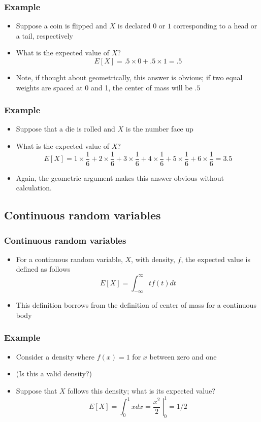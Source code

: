 \documentclass[aspectratio=169]{beamer}
\begin{document}
\begin{frame}
  \frametitle{Example} 
  \begin{itemize}
  \item Suppose a coin is flipped and $X$ is declared $0$ or $1$ corresponding
    to a head or a tail, respectively
  \item What is the expected value of $X$? 
    $$
    E[X] = .5 \times 0 + .5 \times 1 = .5
    $$
  \item Note, if thought about geometrically, this answer is obvious; if two equal
    weights are spaced at 0 and 1, the center of mass will be $.5$
  \end{itemize}
\end{frame}

\begin{frame}\frametitle{Example} 
  \begin{itemize}
  \item Suppose that a die is rolled and $X$ is the number face up
  \item What is the expected value of $X$?
    $$
    E[X] = 1 \times \frac{1}{6} + 2 \times \frac{1}{6} +
    3 \times \frac{1}{6} + 4 \times \frac{1}{6} +
    5 \times \frac{1}{6} + 6 \times \frac{1}{6} = 3.5
    $$
  \item Again, the geometric argument makes this answer obvious without calculation.
  \end{itemize}
\end{frame}

\subsection{Continuous random variables}
\begin{frame}\frametitle{Continuous random variables}
  \begin{itemize}
  \item For a continuous random variable, $X$, with density, $f$, the expected
    value is defined as follows
    $$
    E[X] = \int_{-\infty}^\infty t f(t)dt
    $$
  \item This definition borrows from the definition of center of mass for
    a continuous body
  \end{itemize}
\end{frame}

\begin{frame}\frametitle{Example}
  \begin{itemize}
  \item   Consider a density where $f(x) = 1$ for $x$
    between zero and one
  \item (Is this a valid density?)
  \item Suppose that $X$ follows this density; what is its expected value? 
    $$
    E[X] = \int_{0}^{1} x dx = \left. \frac{x^2}{2} ~\right|_{0}^{1} = 1/2
    $$
  \end{itemize}
\end{frame}
\end{document}
